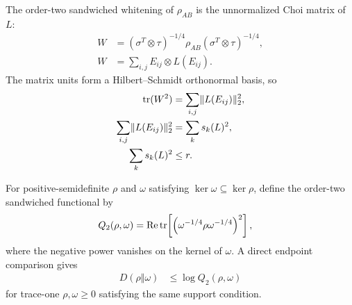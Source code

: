\documentclass[11pt]{article}
\begin{document}
The order-two sandwiched whitening of $\rho_{AB}$ is the unnormalized Choi
matrix of $L$:
\begin{align}
    W
        &=
        (\sigma^T\otimes\tau)^{-1/4}
        \rho_{AB}
        (\sigma^T\otimes\tau)^{-1/4},
    \label{eq:cpgsv17_whitened_state_definition}\\
    W
        &= \sum_{i,j}E_{ij}\otimes L(E_{ij}).
    \label{eq:cpgsv17_whitened_state_choi_form}
\end{align}
The matrix units form a Hilbert--Schmidt orthonormal basis, so
\begin{align}
    \operatorname{tr}(W^2)
        &= \sum_{i,j}\lVert L(E_{ij})\rVert_2^2,
    \label{eq:cpgsv17_choi_parseval}\\
    \sum_{i,j}\lVert L(E_{ij})\rVert_2^2
        &= \sum_k s_k(L)^2,
    \label{eq:cpgsv17_singular_value_sum}\\
    \sum_k s_k(L)^2
        &\leq r.
    \label{eq:cpgsv17_whitened_trace_rank_bound}
\end{align}

For positive-semidefinite $\rho$ and $\omega$ satisfying
$\ker\omega\subseteq\ker\rho$, define the order-two sandwiched functional by
\begin{align}
    Q_2(\rho,\omega)
        &=
        \operatorname{Re}\operatorname{tr}\!\left[\left(\omega^{-1/4}\rho\omega^{-1/4}\right)^2\right],
    \label{eq:cpgsv17_order_two_sandwiched_functional}
\end{align}
where the negative power vanishes on the kernel of $\omega$. A direct endpoint
comparison gives
\begin{align}
    D(\rho\Vert\omega)
        &\leq \log Q_2(\rho,\omega)
    \label{eq:cpgsv17_relative_entropy_order_two_comparison}
\end{align}
for trace-one $\rho,\omega\geq0$ satisfying the same support condition.
\end{document}
